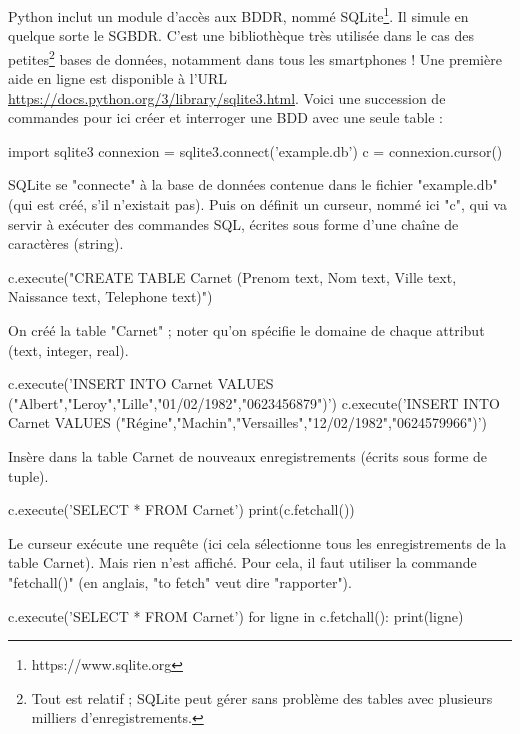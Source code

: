 \documentclass[11pt,a4paper,french,twoside]{PMCours}
\begin{document}
Python inclut un module d’accès aux BDDR, nommé SQLite\footnote{https://www.sqlite.org}. Il simule en quelque sorte le SGBDR. C'est une bibliothèque très utilisée dans le cas des petites\footnote{Tout est relatif ; SQLite peut gérer sans problème des tables avec plusieurs milliers d'enregistrements.} bases de données, notamment dans tous les smartphones ! Une première aide en ligne est disponible à l'URL \url{https://docs.python.org/3/library/sqlite3.html}. Voici une succession de commandes pour ici créer et interroger une BDD avec une seule table :


\begin{Python}
import sqlite3
connexion = sqlite3.connect('example.db')
c = connexion.cursor()
\end{Python}
SQLite se "connecte" à la base de données contenue dans le fichier "example.db" (qui est créé, s'il n'existait pas). Puis on définit un curseur, nommé ici "c", qui va servir à exécuter des commandes SQL, écrites sous forme d'une chaîne de caractères (string). 


\begin{Python}
c.execute("CREATE TABLE Carnet (Prenom text, 
                                Nom text, 
                                Ville text, 
                                Naissance text, 
                                Telephone text)")
\end{Python}
On créé la table "Carnet" ; noter qu'on spécifie le domaine de chaque attribut (text, integer, real).


\begin{Python}
c.execute('INSERT INTO Carnet VALUES ("Albert","Leroy","Lille","01/02/1982","0623456879")')
c.execute('INSERT INTO Carnet VALUES ("Régine","Machin","Versailles","12/02/1982","0624579966")')
\end{Python}
Insère dans la table Carnet de nouveaux enregistrements (écrits sous forme de tuple). 


\begin{Python}
c.execute('SELECT * FROM Carnet')
print(c.fetchall())
\end{Python}
Le curseur exécute une requête (ici cela sélectionne tous les enregistrements de la table Carnet). Mais rien n'est affiché. Pour cela, il faut utiliser la commande "fetchall()" (en anglais, "to fetch" veut dire "rapporter").

\begin{Python}
c.execute('SELECT * FROM Carnet')
for ligne in c.fetchall():
  print(ligne)
\end{Python}
\end{document}
